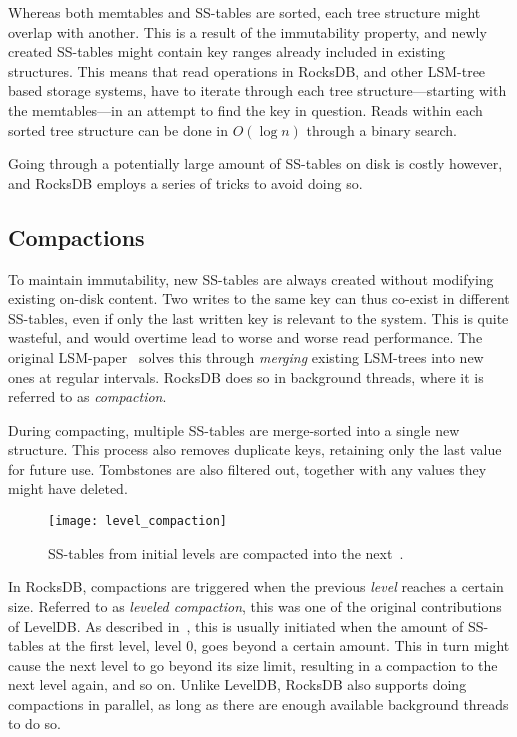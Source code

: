 Whereas both memtables and SS-tables are sorted, each tree structure might
overlap with another. This is a result of the immutability property, and newly
created SS-tables might contain key ranges already included in existing
structures. This means that read operations in RocksDB, and other LSM-tree based
storage systems, have to iterate through each tree structure---starting with the
memtables---in an attempt to find the key in question. Reads within each sorted
tree structure can be done in $ O(\log n) $ through a binary search.

Going through a potentially large amount of SS-tables on disk is costly however,
and RocksDB employs a series of tricks to avoid doing so.

\subsection{Compactions}
To maintain immutability, new SS-tables are always created without modifying
existing on-disk content. Two writes to the same key can thus co-exist in
different SS-tables, even if only the last written key is relevant to the
system. This is quite wasteful, and would overtime lead to worse and worse read
performance. The original LSM-paper~\cite{lsm} solves this through
\textit{merging} existing LSM-trees into new ones at regular intervals. RocksDB
does so in background threads, where it is referred to as \textit{compaction}.

During compacting, multiple SS-tables are merge-sorted into a single new
structure. This process also removes duplicate keys, retaining only the last
value for future use. Tombstones are also filtered out, together with any values
they might have deleted.

\begin{figure}[H]
  \centering
  \texttt{[image: level\_compaction]}
  \caption{SS-tables from initial levels are compacted into the next~\cite{rocksdb-compaction}.}
\end{figure}

In RocksDB, compactions are triggered when the previous \textit{level} reaches a
certain size. Referred to as \textit{leveled compaction}, this was one of the
original contributions of LevelDB\@. As described in~\cite{rocksdb-compaction},
this is usually initiated when the amount of SS-tables at the first level, level
0, goes beyond a certain amount. This in turn might cause the next level to go
beyond its size limit, resulting in a compaction to the next level again, and so
on. Unlike LevelDB, RocksDB also supports doing compactions in parallel, as long
as there are enough available background threads to do so.

